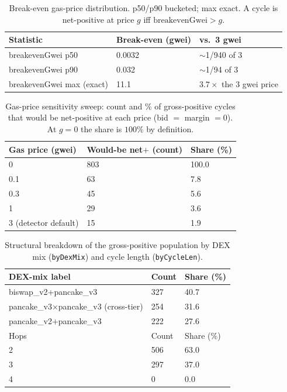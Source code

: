 \documentclass[11pt]{article}
\newcommand{\code}[1]{\texttt{#1}}
\begin{document}
\begin{table}[h]\centering
\caption{Break-even gas-price distribution. p50/p90 bucketed; max exact.
A cycle is net-positive at price $g$ iff $\text{breakevenGwei}>g$.}\label{tab:break}
\begin{tabular}{lll}
\toprule
Statistic & Break-even (gwei) & vs.\ 3 gwei \\
\midrule
breakevenGwei p50 & 0.0032 & $\sim$1/940 of 3 \\
breakevenGwei p90 & 0.032 & $\sim$1/94 of 3 \\
breakevenGwei max (exact) & 11.1 & $3.7\times$ the 3 gwei price \\
\bottomrule
\end{tabular}
\end{table}

\begin{table}[h]\centering
\caption{Gas-price sensitivity sweep: count and \% of gross-positive cycles that
would be net-positive at each price (bid $=$ margin $=0$). At $g=0$ the share is
$100\%$ by definition.}\label{tab:sweep}
\begin{tabular}{lll}
\toprule
Gas price (gwei) & Would-be net$+$ (count) & Share (\%) \\
\midrule
0 & 803 & 100.0 \\
0.1 & 63 & 7.8 \\
0.3 & 45 & 5.6 \\
1 & 29 & 3.6 \\
3 (detector default) & 15 & 1.9 \\
\bottomrule
\end{tabular}
\end{table}

\begin{table}[h]\centering
\caption{Structural breakdown of the gross-positive population by DEX mix
(\code{byDexMix}) and cycle length (\code{byCycleLen}).}\label{tab:struct}
\begin{tabular}{lll}
\toprule
DEX-mix label & Count & Share (\%) \\
\midrule
biswap\_v2+pancake\_v3 & 327 & 40.7 \\
pancake\_v3$\times$pancake\_v3 (cross-tier) & 254 & 31.6 \\
pancake\_v2+pancake\_v3 & 222 & 27.6 \\
\midrule
Hops & Count & Share (\%) \\
\midrule
2 & 506 & 63.0 \\
3 & 297 & 37.0 \\
4 & 0 & 0.0 \\
\bottomrule
\end{tabular}
\end{table}
\end{document}
